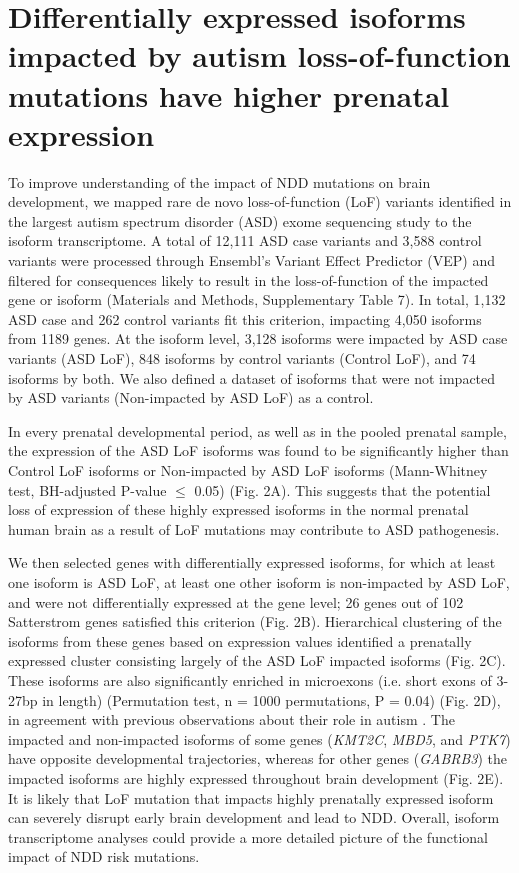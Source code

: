 \documentclass[12pt,chapterheads,final]{ucsd}
\begin{document}
\section{Differentially expressed isoforms impacted by autism loss-of-function mutations have higher prenatal expression }
To improve understanding of the impact of NDD mutations on brain development, we mapped rare de novo loss-of-function (LoF) variants identified in the largest autism spectrum disorder (ASD) exome sequencing study \cite{Satterstrom2019} to the isoform transcriptome. A total of 12,111 ASD case variants and 3,588 control variants were processed through Ensembl's Variant Effect Predictor (VEP) and filtered for consequences likely to result in the loss-of-function of the impacted gene or isoform (Materials and Methods, Supplementary Table 7). In total, 1,132 ASD case and 262 control variants fit this criterion, impacting 4,050 isoforms from 1189 genes. At the isoform level, 3,128 isoforms were impacted by ASD case variants (ASD LoF), 848 isoforms by control variants (Control LoF), and 74 isoforms by both. We also defined a dataset of isoforms that were not impacted by ASD variants (Non-impacted by ASD LoF) as a control. \par
In every prenatal developmental period, as well as in the pooled prenatal sample, the expression of the ASD LoF isoforms was found to be significantly higher than Control LoF isoforms or Non-impacted by ASD LoF isoforms (Mann-Whitney test, BH-adjusted P-value $\leq$ 0.05) (Fig. 2A). This suggests that the potential loss of expression of these highly expressed isoforms in the normal prenatal human brain as a result of LoF mutations may contribute to ASD pathogenesis. \par
We then selected genes with differentially expressed isoforms, for which at least one isoform is ASD LoF, at least one other isoform is non-impacted by ASD LoF, and were not differentially expressed at the gene level; 26 genes out of 102 Satterstrom genes satisfied this criterion (Fig. 2B). Hierarchical clustering of the isoforms from these genes based on expression values identified a prenatally expressed cluster consisting largely of the ASD LoF impacted isoforms (Fig. 2C). These isoforms are also significantly enriched in microexons (i.e. short exons of 3-27bp in length) (Permutation test, n = 1000 permutations, P = 0.04) (Fig. 2D), in agreement with previous observations about their role in autism \cite{Irimia2014,Li2015}. The impacted and non-impacted isoforms of some genes (\textit{KMT2C}, \textit{MBD5}, and \textit{PTK7}) have opposite developmental trajectories, whereas for other genes (\textit{GABRB3}) the impacted isoforms are highly expressed throughout brain development (Fig. 2E). It is likely that LoF mutation that impacts highly prenatally expressed isoform can severely disrupt early brain development and lead to NDD. Overall, isoform transcriptome analyses could provide a more detailed picture of the functional impact of NDD risk mutations. \par
\end{document}
